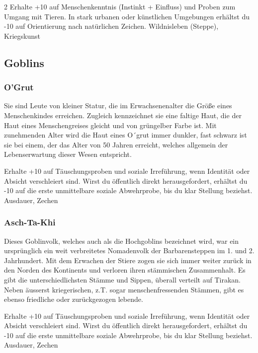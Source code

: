 {\begin{multicols*}{2}
        \abstammungspielwertebox
        {Erhalte +10 auf Menschenkenntnis (Instinkt + Einfluss) und Proben zum Umgang mit Tieren.}
        {In stark urbanen oder künstlichen Umgebungen erhältst du -10 auf Orientierung nach natürlichen Zeichen.}
        {Wildnisleben (Steppe), Kriegskunst}

        \subsection{Goblins}\label{subsec:abstammungen-goblins}

        \subsubsection*{O'Grut}
        Sie sind Leute von kleiner Statur, die im Erwachsenenalter die Größe eines Menschenkindes erreichen. Zugleich kennzeichnet sie eine faltige Haut, die der Haut eines Menschengreises gleicht und von grüngelber Farbe ist. Mit zunehmenden Alter wird die Haut eines O´grut immer dunkler, fast schwarz ist sie bei einem, der das Alter von 50 Jahren erreicht, welches allgemein der Lebenserwartung dieser Wesen entspricht.

        \abstammungspielwertebox
        {Erhalte +10 auf Täuschungsproben und soziale Irreführung, wenn Identität oder Absicht verschleiert sind.}
        {Wirst du öffentlich direkt herausgefordert, erhältst du -10 auf die erste unmittelbare soziale Abwehrprobe, bis du klar Stellung beziehst.}
        {Ausdauer, Zechen}

        \subsubsection*{Asch-Ta-Khi}
        Dieses Goblinvolk, welches auch als die Hochgoblins bezeichnet wird, war ein ursprünglich ein weit verbreitetes Nomadenvolk der Barbarensteppen im 1. und 2. Jahrhundert. Mit dem Erwachen der Stiere zogen sie sich immer weiter zurück in den Norden des Kontinents und verloren ihren stämmischen Zusammenhalt. Es gibt die unterschiedlichsten Stämme und Sippen, überall verteilt auf Tirakan. Neben äusserst kriegerischen, z.T. sogar menschenfressenden Stämmen, gibt es ebenso friedliche oder zurückgezogen lebende.

        \abstammungspielwertebox
        {Erhalte +10 auf Täuschungsproben und soziale Irreführung, wenn Identität oder Absicht verschleiert sind.}
        {Wirst du öffentlich direkt herausgefordert, erhältst du -10 auf die erste unmittelbare soziale Abwehrprobe, bis du klar Stellung beziehst.}
        {Ausdauer, Zechen}


\end{multicols*}}

